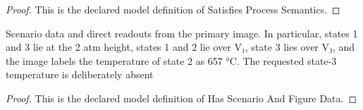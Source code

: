 \begin{proof}
  This is the declared model definition of Satisfies Process Semantics.
\end{proof}
\begin{definition}
  \label{def:physics:phyx-mini-0367:phyxminiproblems-problemphyxmini0367-hasscenarioandfiguredata}
  Scenario data and direct readouts from the primary image. In particular, states 1 and 3 lie at the 2 atm height, states 1 and 2 lie over V₁, state 3 lies over V₃, and the image labels the temperature of state 2 as 657 °C. The requested state-3 temperature is deliberately absent
\end{definition}
\begin{proof}
  This is the declared model definition of Has Scenario And Figure Data.
\end{proof}
